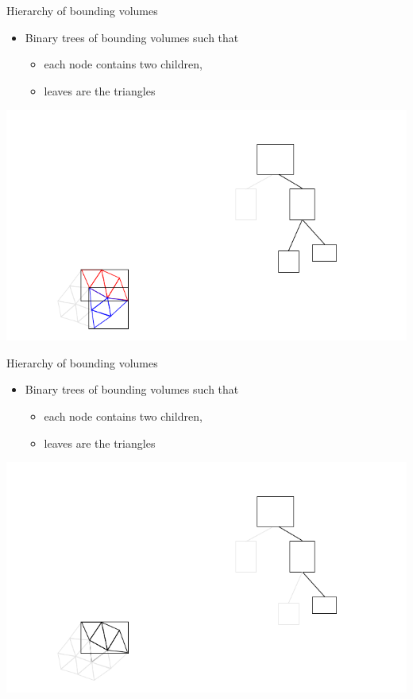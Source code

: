 \begin{frame} {Hierarchy of bounding volumes}
  \begin{itemize}
  \item Binary trees of bounding volumes such that
    \begin{itemize}
    \item each node contains two children,
    \item leaves are the triangles
    \end{itemize}
  \end{itemize}
  \centerline {
    \includegraphics[width=.8\linewidth]{figures/bvh6.pdf}
  }
\end{frame}

\begin{frame} {Hierarchy of bounding volumes}
  \begin{itemize}
  \item Binary trees of bounding volumes such that
    \begin{itemize}
    \item each node contains two children,
    \item leaves are the triangles
    \end{itemize}
  \end{itemize}
  \centerline {
    \includegraphics[width=.8\linewidth]{figures/bvh7.pdf}
  }
\end{frame}

